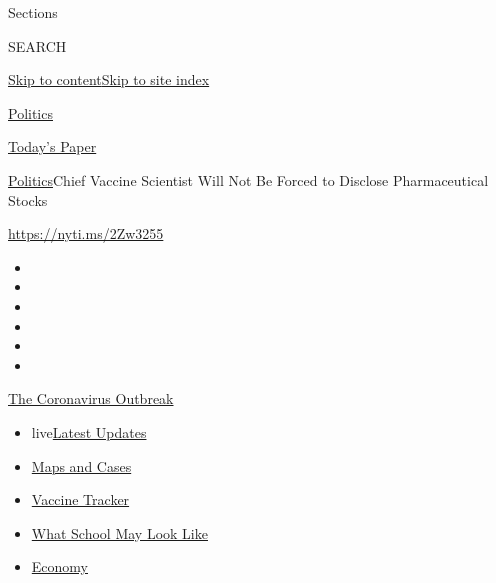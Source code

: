 Sections

SEARCH

\protect\hyperlink{site-content}{Skip to
content}\protect\hyperlink{site-index}{Skip to site index}

\href{https://www.nytimes.com/section/politics}{Politics}

\href{https://myaccount.nytimes.com/auth/login?response_type=cookie\&client_id=vi}{}

\href{https://www.nytimes.com/section/todayspaper}{Today's Paper}

\href{/section/politics}{Politics}\textbar{}Chief Vaccine Scientist Will
Not Be Forced to Disclose Pharmaceutical Stocks

\url{https://nyti.ms/2Zw3255}

\begin{itemize}
\item
\item
\item
\item
\item
\item
\end{itemize}

\href{https://www.nytimes.com/news-event/coronavirus?action=click\&pgtype=Article\&state=default\&region=TOP_BANNER\&context=storylines_menu}{The
Coronavirus Outbreak}

\begin{itemize}
\tightlist
\item
  live\href{https://www.nytimes.com/2020/08/02/world/coronavirus-updates.html?action=click\&pgtype=Article\&state=default\&region=TOP_BANNER\&context=storylines_menu}{Latest
  Updates}
\item
  \href{https://www.nytimes.com/interactive/2020/us/coronavirus-us-cases.html?action=click\&pgtype=Article\&state=default\&region=TOP_BANNER\&context=storylines_menu}{Maps
  and Cases}
\item
  \href{https://www.nytimes.com/interactive/2020/science/coronavirus-vaccine-tracker.html?action=click\&pgtype=Article\&state=default\&region=TOP_BANNER\&context=storylines_menu}{Vaccine
  Tracker}
\item
  \href{https://www.nytimes.com/interactive/2020/07/29/us/schools-reopening-coronavirus.html?action=click\&pgtype=Article\&state=default\&region=TOP_BANNER\&context=storylines_menu}{What
  School May Look Like}
\item
  \href{https://www.nytimes.com/live/2020/07/31/business/stock-market-today-coronavirus?action=click\&pgtype=Article\&state=default\&region=TOP_BANNER\&context=storylines_menu}{Economy}
\end{itemize}

